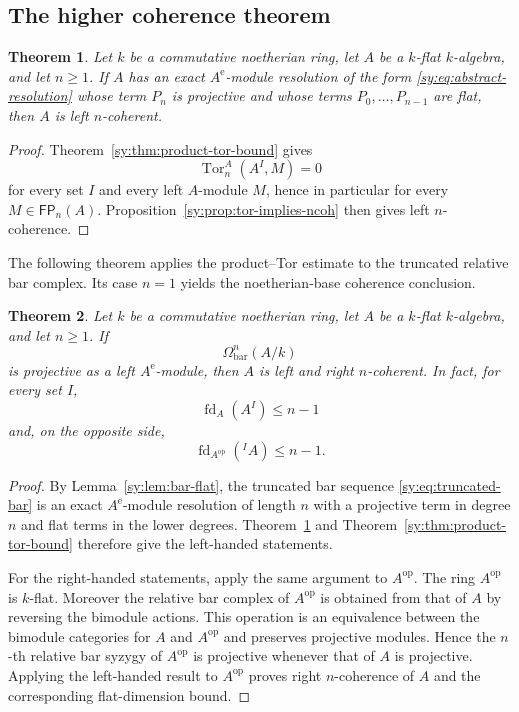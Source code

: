 \documentclass[11pt]{article}
\numberwithin{equation}{section}
\newtheorem{theorem}{Theorem}[section]
\theoremstyle{definition}
\theoremstyle{remark}
\newcommand{\Tor}{\operatorname{Tor}}
\newcommand{\fd}{\operatorname{fd}}
\newcommand{\FP}{\mathsf{FP}}
\begin{document}
\subsection{The higher coherence theorem}

\begin{theorem}
\label{sy:thm:abstract-main}
Let $k$ be a commutative noetherian ring, let $A$ be a $k$-flat
$k$-algebra, and let $n\geq1$.  If $A$ has an exact $A^{\mathrm e}$-module resolution of the form
\eqref{sy:eq:abstract-resolution} whose term $P_n$ is projective and
whose terms $P_0,\ldots,P_{n-1}$ are flat, then $A$ is left
$n$-coherent.
\end{theorem}

\begin{proof}
Theorem~\ref{sy:thm:product-tor-bound} gives
\[
\Tor_n^A(A^I,M)=0
\]
for every set $I$ and every left $A$-module $M$, hence in particular for
every $M\in\FP_n(A)$.  Proposition~\ref{sy:prop:tor-implies-ncoh} then gives
left $n$-coherence.
\end{proof}

The following theorem applies the product--Tor estimate to the truncated
relative bar complex.  Its case $n=1$ yields the noetherian-base
coherence conclusion.

\begin{theorem}
\label{sy:thm:bar-main}
Let $k$ be a commutative noetherian ring, let $A$ be a $k$-flat
$k$-algebra, and let $n\geq1$.  If
\[
\Omega^n_{\mathrm{bar}}(A/k)
\]
is projective as a left $A^{\mathrm e}$-module, then $A$ is left and right
$n$-coherent.  In fact, for every set $I$,
\[
\fd_A(A^I)\leq n-1
\]
and, on the opposite side,
\[
\fd_{A^{\mathrm{op}}}({}^IA)\leq n-1.
\]
\end{theorem}

\begin{proof}
By Lemma~\ref{sy:lem:bar-flat}, the truncated bar sequence
\eqref{sy:eq:truncated-bar} is an exact $A^{\mathrm e}$-module
resolution of length $n$ with a projective term in degree $n$ and
flat terms in the lower degrees.  Theorem~\ref{sy:thm:abstract-main} and
Theorem~\ref{sy:thm:product-tor-bound} therefore give the left-handed
statements.

For the right-handed statements, apply the same argument to
$A^{\mathrm{op}}$.  The ring $A^{\mathrm{op}}$ is $k$-flat.  Moreover the
relative bar complex of $A^{\mathrm{op}}$ is obtained from that of $A$ by
reversing the bimodule actions.  This operation is an equivalence between
the bimodule categories for $A$ and $A^{\mathrm{op}}$ and preserves
projective modules.  Hence the $n$-th relative bar syzygy of
$A^{\mathrm{op}}$ is projective whenever that of $A$ is projective.
Applying the left-handed result to $A^{\mathrm{op}}$ proves right
$n$-coherence of $A$ and the corresponding flat-dimension bound.
\end{proof}
\end{document}
